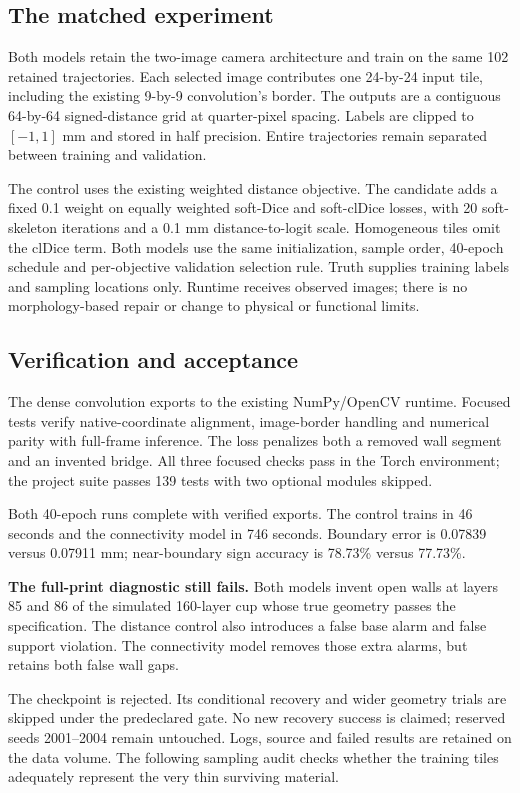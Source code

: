 \documentclass[10pt,letterpaper]{article}
\newcommand{\note}[1]{\begin{tcolorbox}[colback=pale,colframe=teal!55,boxrule=0.5pt,arc=2pt,left=8pt,right=8pt,top=5pt,bottom=5pt]#1\end{tcolorbox}}
\begin{document}
\subsection*{The matched experiment}
Both models retain the two-image camera architecture and train on the same 102
retained trajectories. Each selected image contributes one 24-by-24 input tile,
including the existing 9-by-9 convolution's border. The outputs are a contiguous
64-by-64 signed-distance grid at quarter-pixel spacing. Labels are clipped to
$[-1,1]$ mm and stored in half precision. Entire trajectories remain separated
between training and validation.

The control uses the existing weighted distance objective. The candidate adds a
fixed 0.1 weight on equally weighted soft-Dice and soft-clDice losses, with 20
soft-skeleton iterations and a 0.1 mm distance-to-logit scale. Homogeneous tiles
omit the clDice term. Both models use the same initialization, sample order,
40-epoch schedule and per-objective validation selection rule. Truth supplies
training labels and sampling locations only. Runtime receives observed images;
there is no morphology-based repair or change to physical or functional limits.

\subsection*{Verification and acceptance}
The dense convolution exports to the existing NumPy/OpenCV runtime. Focused tests
verify native-coordinate alignment, image-border handling and numerical parity
with full-frame inference. The loss penalizes both a removed wall segment and an
invented bridge. All three focused checks pass in the Torch environment; the
project suite passes 139 tests with two optional modules skipped.

Both 40-epoch runs complete with verified exports. The control trains in 46
seconds and the connectivity model in 746 seconds. Boundary error is 0.07839
versus 0.07911 mm; near-boundary sign accuracy is 78.73\% versus 77.73\%.

\note{\textbf{The full-print diagnostic still fails.} Both models invent open
walls at layers 85 and 86 of the simulated 160-layer cup whose true geometry
passes the specification. The distance
control also introduces a false base alarm and false support violation. The
connectivity model removes those extra alarms, but retains both false wall gaps.}

The checkpoint is rejected. Its conditional recovery and wider geometry trials
are skipped under the predeclared gate. No new recovery success is claimed;
reserved seeds 2001--2004 remain untouched. Logs, source and failed results are
retained on the data volume. The following sampling audit checks whether the
training tiles adequately represent the very thin surviving material.
\end{document}
